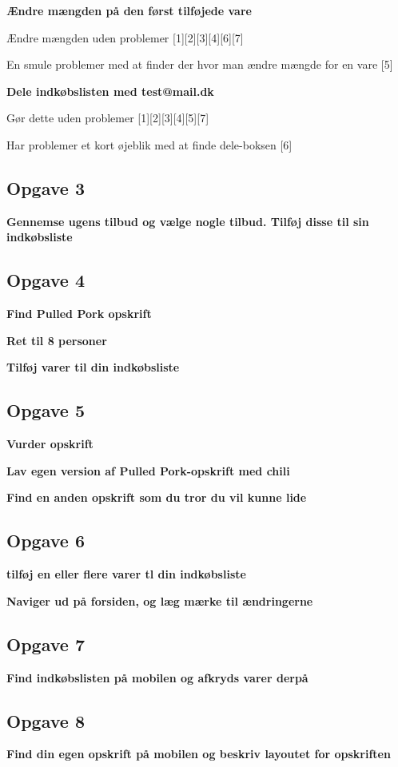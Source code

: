 \textbf{Ændre mængden på den først tilføjede vare}

Ændre mængden uden problemer [1][2][3][4][6][7]

En smule problemer med at finder der hvor man ændre mængde for en vare [5]

\textbf{Dele indkøbslisten med test@mail.dk}

Gør dette uden problemer [1][2][3][4][5][7]

Har problemer et kort øjeblik med at finde dele-boksen [6] 

\subsection{Opgave 3} 
\textbf{Gennemse ugens tilbud og vælge nogle tilbud. Tilføj disse til sin indkøbsliste}


\subsection{Opgave 4}
\textbf{Find Pulled Pork opskrift}

\textbf{Ret til 8 personer}

\textbf{Tilføj varer til din indkøbsliste}

\subsection{Opgave 5}
\textbf{Vurder opskrift}

\textbf{Lav egen version af Pulled Pork-opskrift med chili}

\textbf{Find en anden opskrift som du tror du vil kunne lide}

\subsection{Opgave 6}
\textbf{tilføj en eller flere varer tl din indkøbsliste}

\textbf{Naviger ud på forsiden, og læg mærke til ændringerne}

\subsection{Opgave 7}
\textbf{Find indkøbslisten på mobilen og afkryds varer derpå}

\subsection{Opgave 8}
\textbf{Find din egen opskrift på mobilen og beskriv layoutet for opskriften}


